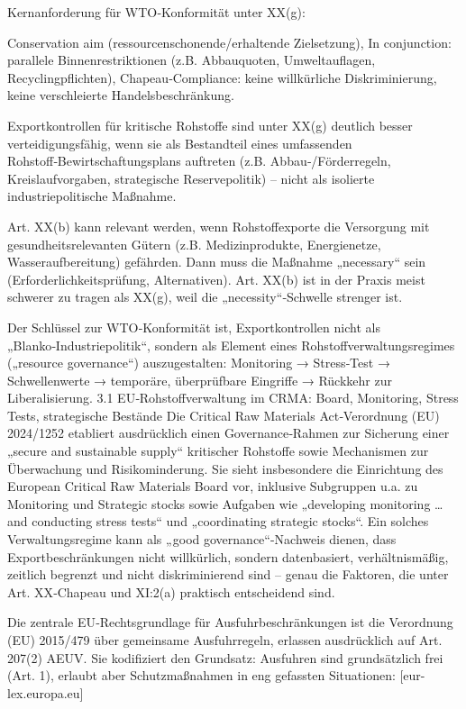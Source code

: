 \documentclass[12pt,a4paper,oneside]{book} %
\begin{document}
Kernanforderung für WTO‑Konformität unter XX(g):

Conservation aim (ressourcenschonende/erhaltende Zielsetzung),
In conjunction: parallele Binnenrestriktionen (z.B. Abbauquoten, Umweltauflagen, Recyclingpflichten),
Chapeau‑Compliance: keine willkürliche Diskriminierung, keine verschleierte Handelsbeschränkung.

Exportkontrollen für kritische Rohstoffe sind unter XX(g) deutlich besser verteidigungsfähig, wenn sie als Bestandteil eines umfassenden Rohstoff‑Bewirtschaftungsplans auftreten (z.B. Abbau‑/Förderregeln, Kreislaufvorgaben, strategische Reservepolitik) – nicht als isolierte industriepolitische Maßnahme.

Art. XX(b) kann relevant werden, wenn Rohstoffexporte die Versorgung mit gesundheitsrelevanten Gütern (z.B. Medizinprodukte, Energienetze, Wasseraufbereitung) gefährden. Dann muss die Maßnahme „necessary“ sein (Erforderlichkeitsprüfung, Alternativen). Art. XX(b) ist in der Praxis meist schwerer zu tragen als XX(g), weil die „necessity“‑Schwelle strenger ist.

Der Schlüssel zur WTO‑Konformität ist, Exportkontrollen nicht als „Blanko‑Industriepolitik“, sondern als Element eines Rohstoffverwaltungsregimes („resource governance“) auszugestalten: Monitoring → Stress‑Test → Schwellenwerte → temporäre, überprüfbare Eingriffe → Rückkehr zur Liberalisierung.
3.1 EU‑Rohstoffverwaltung im CRMA: Board, Monitoring, Stress Tests, strategische Bestände
Die Critical Raw Materials Act‑Verordnung (EU) 2024/1252 etabliert ausdrücklich einen Governance‑Rahmen zur Sicherung einer „secure and sustainable supply“ kritischer Rohstoffe sowie Mechanismen zur Überwachung und Risikominderung. 
Sie sieht insbesondere die Einrichtung des European Critical Raw Materials Board vor, inklusive Subgruppen u.a. zu Monitoring und Strategic stocks sowie Aufgaben wie „developing monitoring … and conducting stress tests“ und „coordinating strategic stocks“.
Ein solches Verwaltungsregime kann als „good governance“-Nachweis dienen, dass Exportbeschränkungen nicht willkürlich, sondern datenbasiert, verhältnismäßig, zeitlich begrenzt und nicht diskriminierend sind – genau die Faktoren, die unter Art. XX‑Chapeau und XI:2(a) praktisch entscheidend sind.

Die zentrale EU‑Rechtsgrundlage für Ausfuhrbeschränkungen ist die Verordnung (EU) 2015/479 über gemeinsame Ausfuhrregeln, erlassen ausdrücklich auf Art. 207(2) AEUV. 
Sie kodifiziert den Grundsatz: Ausfuhren sind grundsätzlich frei (Art. 1), erlaubt aber Schutzmaßnahmen in eng gefassten Situationen: [eur-lex.europa.eu]
\end{document}
